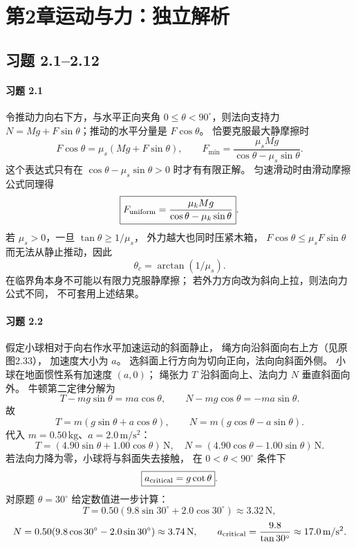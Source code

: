 \section*{第2章\quad 运动与力：独立解析}
\subsection*{习题 2.1--2.12}

\paragraph{习题 2.1}
令推动力向右下方，与水平正向夹角
\(0\le\theta<90^\circ\)，则法向支持力
\(N=Mg+F\sin\theta\)；推动的水平分量是
\(F\cos\theta\)。
恰要克服最大静摩擦时
\[
 F\cos\theta=\mu_s(Mg+F\sin\theta),
 \qquad
 \boxed{F_{\min}=\frac{\mu_s Mg}
 {\cos\theta-\mu_s\sin\theta}}.
\]
这个表达式只有在
\(\cos\theta-\mu_s\sin\theta>0\) 时才有有限正解。
匀速滑动时由滑动摩擦公式同理得
\[
 \boxed{F_{\rm uniform}=\frac{\mu_k Mg}
 {\cos\theta-\mu_k\sin\theta}}.
\]
若 \(\mu_s>0\)，一旦
\(\tan\theta\ge1/\mu_s\)，
外力越大也同时压紧木箱，
\(F\cos\theta\le\mu_sF\sin\theta\)
而无法从静止推动，因此
\[
 \boxed{\theta_c=\arctan(1/\mu_s)}.
\]
在临界角本身不可能以有限力克服静摩擦；
若外力方向改为斜向上拉，则法向力公式不同，
不可套用上述结果。

\paragraph{习题 2.2}
假定小球相对于向右作水平加速运动的斜面静止，
绳方向沿斜面向右上方（见原图2.33），
加速度大小为 \(a\)。
选斜面上行方向为切向正向，法向向斜面外侧。
小球在地面惯性系有加速度 \((a,0)\)；
绳张力 \(T\) 沿斜面向上、法向力 \(N\) 垂直斜面向外。
牛顿第二定律分解为
\[
 T-mg\sin\theta=ma\cos\theta,\qquad
 N-mg\cos\theta=-ma\sin\theta.
\]
故
\[
 \boxed{T=m(g\sin\theta+a\cos\theta)},\qquad
 \boxed{N=m(g\cos\theta-a\sin\theta)}.
\]
代入 \(m=0.50\,\mathrm{kg}\)、\(a=2.0\,\mathrm{m/s^2}\)：
\[
 T=(4.90\sin\theta+1.00\cos\theta)\,\mathrm N,\quad
 N=(4.90\cos\theta-1.00\sin\theta)\,\mathrm N.
\]
若法向力降为零，小球将与斜面失去接触，
在 \(0<\theta<90^\circ\) 条件下
\[
 \boxed{a_{\rm critical}=g\cot\theta}.
\]
对原题 \(\theta=30^\circ\) 给定数值进一步计算：
\[
 T=0.50(9.8\sin30^\circ+2.0\cos30^\circ)
 \approx3.32\,\mathrm N,
\]
\[
 N=0.50(9.8\cos30^\circ-2.0\sin30^\circ)
 \approx3.74\,\mathrm N,\qquad
 a_{\rm critical}=\frac{9.8}{\tan30^\circ}
 \approx17.0\,\mathrm{m/s^2}.
\]

